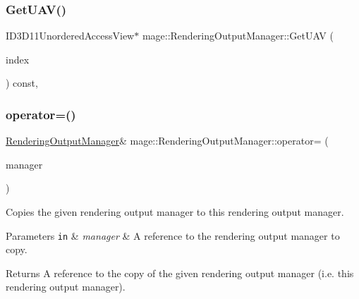 \hypertarget{classmage_1_1_rendering_output_manager_a69f782de38807401a5ee6ab4d47a928c}{}\label{classmage_1_1_rendering_output_manager_a69f782de38807401a5ee6ab4d47a928c} 
\subsubsection{\texorpdfstring{Get\+U\+A\+V()}{GetUAV()}}
{\footnotesize\ttfamily I\+D3\+D11\+Unordered\+Access\+View$\ast$ mage\+::\+Rendering\+Output\+Manager\+::\+Get\+U\+AV (\begin{DoxyParamCaption}\item[{\hyperlink{classmage_1_1_rendering_output_manager_a34cdd58dd0dda9d78878d79aa3393b89}{U\+A\+V\+Index}}]{index }\end{DoxyParamCaption}) const\hspace{0.3cm}{\ttfamily [private]}, {\ttfamily [noexcept]}}

\hypertarget{classmage_1_1_rendering_output_manager_ab31c30892c950603e39208a918ac9d49}{}\label{classmage_1_1_rendering_output_manager_ab31c30892c950603e39208a918ac9d49} 
\subsubsection{\texorpdfstring{operator=()}{operator=()}\hspace{0.1cm}{\footnotesize\ttfamily [1/2]}}
{\footnotesize\ttfamily \hyperlink{classmage_1_1_rendering_output_manager}{Rendering\+Output\+Manager}\& mage\+::\+Rendering\+Output\+Manager\+::operator= (\begin{DoxyParamCaption}\item[{const \hyperlink{classmage_1_1_rendering_output_manager}{Rendering\+Output\+Manager} \&}]{manager }\end{DoxyParamCaption})\hspace{0.3cm}{\ttfamily [delete]}}

Copies the given rendering output manager to this rendering output manager.


\begin{DoxyParams}[1]{Parameters}
\mbox{\tt in}  & {\em manager} & A reference to the rendering output manager to copy. \\
\hline
\end{DoxyParams}
\begin{DoxyReturn}{Returns}
A reference to the copy of the given rendering output manager (i.\+e. this rendering output manager). 
\end{DoxyReturn}
\hypertarget{classmage_1_1_rendering_output_manager_a491a7ef504f7ff8292fddeca7efdb130}{}\label{classmage_1_1_rendering_output_manager_a491a7ef504f7ff8292fddeca7efdb130} 
